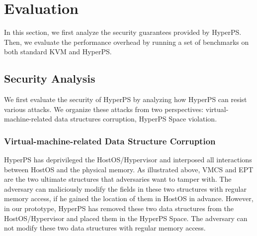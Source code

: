 \section{Evaluation}\label{sec:evaluation}
In this section, we first analyze the security guarantees provided by HyperPS. Then, we evaluate the performance overhead by running a set of benchmarks on both standard KVM and HyperPS.



\subsection{Security Analysis}
 
We first evaluate the security of HyperPS by analyzing how HyperPS can resist various attacks. We organize these attacks from two perspectives: virtual-machine-related data structures corruption, HyperPS Space violation. 

\subsubsection{Virtual-machine-related Data Structure Corruption}%
\label{ssub:virtual_machine_related_data_structure_corruption}
HyperPS has deprivileged the HostOS/Hypervisor and interposed all interactions between HostOS and the physical memory.
As illustrated above, VMCS and EPT are the two ultimate structures that adversaries want to tamper with. 
The adversary can maliciously modify the fields in these two structures with regular memory access, if he gained the location of them in HostOS in advance. 
However, in our prototype, HyperPS has removed these two data structures from the HostOS/Hypervisor and placed them in the HyperPS Space.
The adversary can not modify these two data structures with regular memory access. 

